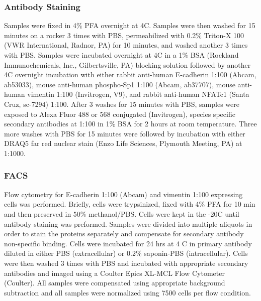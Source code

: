 \documentclass[11pt,letterpaper]{article}
\begin{document}
\subsubsection*{Antibody Staining}
Samples were fixed in 4\% PFA overnight at 4C.   Samples were then washed for 15 minutes on a rocker 3 times with PBS, permeabilized with 0.2\% Triton-X 100 (VWR International, Radnor, PA) for 10 minutes, and washed another 3 times with PBS.  Samples were incubated overnight at 4C in a 1\% BSA (Rockland Immunochemicals, Inc., Gilbertsville, PA) blocking solution followed by another 4C overnight incubation with either rabbit anti-human E-cadherin 1:100 (Abcam, ab53033), mouse anti-human phospho-Sp1 1:100 (Abcam, ab37707), mouse anti-human vimentin 1:100  (Invitrogen, V9), and rabbit anti-human NFATc1 (Santa Cruz, sc-7294) 1:100.   After 3 washes for 15 minutes with PBS, samples were exposed to Alexa Fluor 488 or 568 conjugated (Invitrogen), species specific secondary antibodies at 1:100 in 1\% BSA for 2 hours at room temperature. Three more washes with PBS for 15 minutes were followed by incubation with either DRAQ5 far red nuclear stain (Enzo Life Sciences, Plymouth Meeting, PA) at 1:1000.

\subsubsection*{FACS}
Flow cytometry for E-cadherin 1:100 (Abcam) and vimentin 1:100 expressing cells was performed.  Briefly, cells were trypsinized, fixed with 4\% PFA for 10 min and then preserved in 50\% methanol/PBS.  Cells were kept in the -20C until antibody staining was preformed.   Samples were divided into multiple aliquots in order to stain the proteins separately and compensate for secondary antibody non-specific binding. Cells were incubated for 24 hrs at 4 C in primary antibody diluted in either PBS (extracellular) or 0.2\% saponin-PBS (intracellular). Cells were then washed 3 times with PBS and incubated with appropriate secondary antibodies and imaged using a Coulter Epics XL-MCL Flow Cytometer (Coulter).  All samples were compensated using appropriate background subtraction and all samples were normalized using 7500 cells per flow condition.
\end{document}
